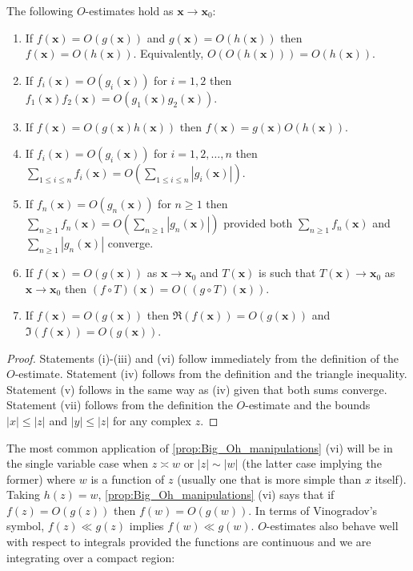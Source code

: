       \begin{proposition}\label{prop:Big_Oh_manipulations}
          The following $O$-estimates hold as $\mathbf{x} \to \mathbf{x}_{0}$:
          \begin{enumerate}[label*=(\roman*)]
            \item If $f(\mathbf{x}) = O(g(\mathbf{x}))$ and $g(\mathbf{x}) = O(h(\mathbf{x}))$ then $f(\mathbf{x}) = O(h(\mathbf{x}))$. Equivalently, $O(O(h(\mathbf{x}))) = O(h(\mathbf{x}))$.
            \item If $f_{i}(\mathbf{x}) = O(g_{i}(\mathbf{x}))$ for $i = 1,2$ then $f_{1}(\mathbf{x})f_{2}(\mathbf{x}) = O(g_{1}(\mathbf{x})g_{2}(\mathbf{x}))$.
            \item If $f(\mathbf{x}) = O(g(\mathbf{x})h(\mathbf{x}))$ then $f(\mathbf{x}) = g(\mathbf{x})O(h(\mathbf{x}))$.
            \item If $f_{i}(\mathbf{x}) = O(g_{i}(\mathbf{x}))$ for $i = 1,2,\ldots,n$ then $\sum_{1 \le i \le n}f_{i}(\mathbf{x}) = O\left(\sum_{1 \le i \le n}|g_{i}(\mathbf{x})|\right)$.
            \item If $f_{n}(\mathbf{x}) = O(g_{n}(\mathbf{x}))$ for $n \ge 1$ then $\sum_{n \ge 1}f_{n}(\mathbf{x}) = O\left(\sum_{n \ge 1}|g_{n}(\mathbf{x})|\right)$ provided both $\sum_{n \ge 1}f_{n}(\mathbf{x})$ and $\sum_{n \ge 1}|g_{n}(\mathbf{x})|$ converge.
            \item If $f(\mathbf{x}) = O(g(\mathbf{x}))$ as $\mathbf{x} \to \mathbf{x}_{0}$ and $T(\mathbf{x})$ is such that $T(\mathbf{x}) \to \mathbf{x}_{0}$ as $\mathbf{x} \to \mathbf{x}_{0}$ then $(f \circ T)(\mathbf{x}) = O((g \circ T)(\mathbf{x}))$.
            \item If $f(\mathbf{x}) = O(g(\mathbf{x}))$ then $\Re(f(\mathbf{x})) = O(g(\mathbf{x}))$ and $\Im(f(\mathbf{x})) = O(g(\mathbf{x}))$.
          \end{enumerate}
      \end{proposition}
      \begin{proof}
        Statements (i)-(iii) and (vi) follow immediately from the definition of the $O$-estimate. Statement (iv) follows from the definition and the triangle inequality. Statement (v) follows in the same way as (iv) given that both sums converge. Statement (vii) follows from the definition the $O$-estimate and the bounds $|x| \le |z|$ and $|y| \le |z|$ for any complex $z$.
      \end{proof}

      The most common application of \cref{prop:Big_Oh_manipulations} (vi) will be in the single variable case when $z \asymp w$ or $|z| \sim |w|$ (the latter case implying the former) where $w$ is a function of $z$ (usually one that is more simple than $x$ itself). Taking $h(z) = w$, \cref{prop:Big_Oh_manipulations} (vi) says that if $f(z) = O(g(z))$ then $f(w) = O(g(w))$. In terms of Vinogradov's symbol, $f(z) \ll g(z)$ implies $f(w) \ll g(w)$. $O$-estimates also behave well with respect to integrals provided the functions are continuous and we are integrating over a compact region:


